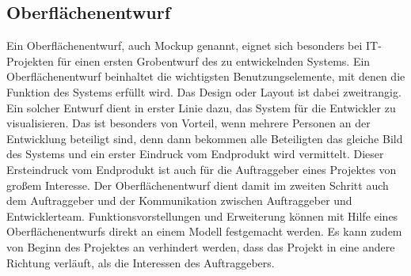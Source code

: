 \subsection{Oberflächenentwurf}
\label{sec:Oberflaechenentwuf}

Ein Oberflächenentwurf, auch Mockup genannt, eignet sich besonders bei IT-Projekten für einen ersten Grobentwurf des zu entwickelnden Systems. Ein Oberflächenentwurf beinhaltet die wichtigsten Benutzungselemente, mit denen die Funktion des Systems erfüllt wird. Das Design oder Layout ist dabei zweitrangig. Ein solcher Entwurf dient in erster Linie dazu, das System für die Entwickler zu visualisieren. Das ist besonders von Vorteil, wenn mehrere Personen an der Entwicklung beteiligt sind, denn dann bekommen alle Beteiligten das gleiche Bild des Systems und ein erster Eindruck vom Endprodukt wird vermittelt. Dieser Ersteindruck vom Endprodukt ist auch für die Auftraggeber eines Projektes von großem Interesse. Der Oberflächenentwurf dient damit im zweiten Schritt auch dem Auftraggeber und der Kommunikation zwischen Auftraggeber und Entwicklerteam. Funktionsvorstellungen und Erweiterung können mit Hilfe eines Oberflächenentwurfs direkt an einem Modell festgemacht werden. Es kann zudem von Beginn des Projektes an verhindert werden, dass das Projekt in eine andere Richtung verläuft, als die Interessen des Auftraggebers.

